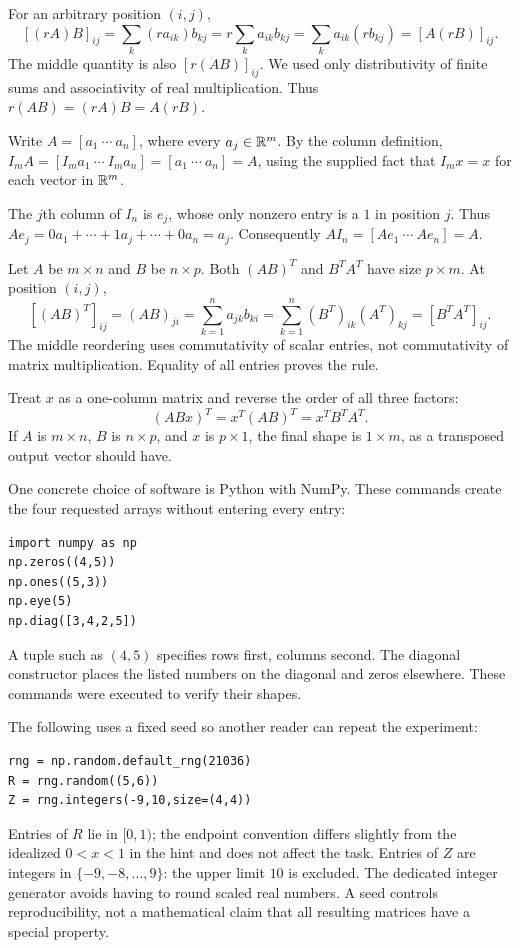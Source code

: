 For an arbitrary position $(i,j)$,
\[
 [(rA)B]_{ij}=\sum_k(ra_{ik})b_{kj}
 =r\sum_k a_{ik}b_{kj}
 =\sum_k a_{ik}(rb_{kj})=[A(rB)]_{ij}.
\]
The middle quantity is also $[r(AB)]_{ij}$.
We used only distributivity of finite sums and associativity of real
multiplication. Thus $r(AB)=(rA)B=A(rB)$.

Write $A=[a_1\ \cdots\ a_n]$, where every $a_j\in\mathbb{R}^m$.
By the column definition,
$I_mA=[I_ma_1\ \cdots\ I_ma_n]=[a_1\ \cdots\ a_n]=A$,
using the supplied fact that $I_mx=x$ for each vector in $\mathbb{R}^m$.

The $j$th column of $I_n$ is $e_j$, whose only nonzero entry is a $1$
in position $j$. Thus $Ae_j=0a_1+\cdots+1a_j+\cdots+0a_n=a_j$.
Consequently $AI_n=[Ae_1\ \cdots\ Ae_n]=A$.

Let $A$ be $m\times n$ and $B$ be $n\times p$. Both $(AB)^T$ and
$B^TA^T$ have size $p\times m$. At position $(i,j)$,
\[
 [(AB)^T]_{ij}=(AB)_{ji}
 =\sum_{k=1}^n a_{jk}b_{ki}
 =\sum_{k=1}^n (B^T)_{ik}(A^T)_{kj}
 =[B^TA^T]_{ij}.
\]
The middle reordering uses commutativity of scalar entries, not
commutativity of matrix multiplication. Equality of all entries proves
the rule.

Treat $x$ as a one-column matrix and reverse the order of all three factors:
\[
 (ABx)^T=x^T(AB)^T=\boxed{x^TB^TA^T}.
\]
If $A$ is $m\times n$, $B$ is $n\times p$, and $x$ is $p\times1$,
the final shape is $1\times m$, as a transposed output vector should have.

One concrete choice of software is Python with NumPy. These commands create
the four requested arrays without entering every entry:
\begin{verbatim}
import numpy as np
np.zeros((4,5))
np.ones((5,3))
np.eye(5)
np.diag([3,4,2,5])
\end{verbatim}
A tuple such as $(4,5)$ specifies rows first, columns second.
The diagonal constructor places the listed numbers on the diagonal and
zeros elsewhere. These commands were executed to verify their shapes.

The following uses a fixed seed so another reader can repeat the experiment:
\begin{verbatim}
rng = np.random.default_rng(21036)
R = rng.random((5,6))
Z = rng.integers(-9,10,size=(4,4))
\end{verbatim}
Entries of $R$ lie in $[0,1)$; the endpoint convention differs slightly from
the idealized $0<x<1$ in the hint and does not affect the task.
Entries of $Z$ are integers in $\{-9,-8,\ldots,9\}$: the upper limit
$10$ is excluded. The dedicated integer generator avoids having to round
scaled real numbers. A seed controls reproducibility, not a mathematical
claim that all resulting matrices have a special property.

